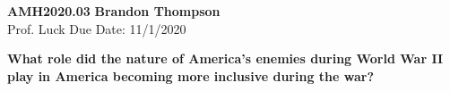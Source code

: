 \noindent
\textbf{AMH2020.03} \hfill \textbf{Brandon Thompson} \\
\normalsize Prof. Luck \hfill Due Date: 11/1/2020 \\

\begin{center}
\textbf{What role did the nature of America's enemies during World War II play in America becoming more inclusive during the war?}
\end{center}